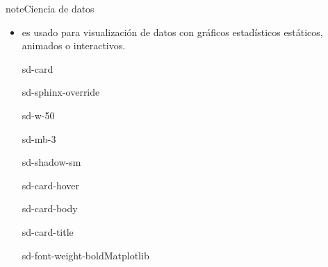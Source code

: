 \documentclass[letterpaper,10pt,spanish]{sphinxmanual}
\begin{document}
\begin{sphinxadmonition}{note}{Ciencia de datos}
\begin{itemize}
\begin{sphinxuseclass}{sd-card}
\begin{sphinxuseclass}{sd-sphinx-override}
\begin{sphinxuseclass}{sd-w-25}
\begin{sphinxuseclass}{sd-mb-3}
\begin{sphinxuseclass}{sd-shadow-sm}
\begin{sphinxuseclass}{sd-card-hover}
\begin{sphinxuseclass}{sd-card-body}
\begin{sphinxuseclass}{sd-card-title}
\begin{sphinxuseclass}{sd-font-weight-bold}NumPy
\end{sphinxuseclass}
\end{sphinxuseclass}
\end{sphinxuseclass}
\noindent{}
\end{sphinxuseclass}
\end{sphinxuseclass}
\end{sphinxuseclass}
\end{sphinxuseclass}
\end{sphinxuseclass}
\end{sphinxuseclass}
\item {} 
\sphinxAtStartPar
{} es usado para visualización de datos con gráficos estadísticos estáticos, animados o interactivos.

\begin{sphinxuseclass}{sd-card}
\begin{sphinxuseclass}{sd-sphinx-override}
\begin{sphinxuseclass}{sd-w-50}
\begin{sphinxuseclass}{sd-mb-3}
\begin{sphinxuseclass}{sd-shadow-sm}
\begin{sphinxuseclass}{sd-card-hover}
\begin{sphinxuseclass}{sd-card-body}
\begin{sphinxuseclass}{sd-card-title}
\begin{sphinxuseclass}{sd-font-weight-bold}Matplotlib
\end{sphinxuseclass}
\end{sphinxuseclass}
\end{sphinxuseclass}
\noindent{}
\end{sphinxuseclass}
\end{sphinxuseclass}
\end{sphinxuseclass}
\end{sphinxuseclass}
\end{sphinxuseclass}
\end{sphinxuseclass}
\end{itemize}
\end{sphinxadmonition}
\end{document}
